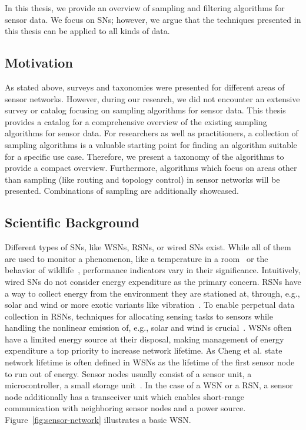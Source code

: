 In this thesis, we provide an overview of sampling and filtering algorithms for
sensor data. We focus on \acp{SN}; however, we argue that the techniques
presented in this thesis can be applied to all kinds of data. 


\subsection{Motivation}
\label{sec:motivation}

As stated above, surveys and taxonomies were presented for different areas of
sensor networks. However, during our research, we did not encounter an
extensive survey or catalog focusing on sampling algorithms for sensor data.
This thesis provides a catalog for a comprehensive overview of the existing
sampling algorithms for sensor data. For researchers as well as practitioners,
a collection of sampling algorithms is a valuable starting point for finding an
algorithm suitable for a specific use case. Therefore, we present a taxonomy of
the algorithms to provide a compact overview. Furthermore, algorithms which
focus on areas other than sampling (like routing and topology control) in
sensor networks will be presented. Combinations of sampling are additionally
showcased.

\subsection{Scientific Background}
\label{sec:Scientific Background}

Different types of \acp{SN}, like \acp{WSN}, \acp{RSN}, or wired \acp{SN}
exist. While all of them are used to monitor a phenomenon, like a temperature
in a room~\cite{labdata} or the behavior of
wildlife~\cite{bennett2011cranetracker}, performance indicators vary in their
significance. Intuitively, wired \acp{SN} do not consider energy expenditure as
the primary concern. \acp{RSN} have a way to collect energy from the
environment they are stationed at, through, e.g., solar and wind or more exotic
variants like vibration~\cite{perpetuum}. To enable perpetual data collection
in \acp{RSN}, techniques for allocating sensing tasks to sensors while handling
the nonlinear emission of, e.g., solar and wind is
crucial~\cite{liu2011perpetual}. \acp{WSN} often have a limited energy source
at their disposal, making management of energy expenditure a top priority to
increase network lifetime. As Cheng et al. state~\cite{cheng2013stcdg} network
lifetime is often defined in \acp{WSN} as the lifetime of the first sensor node
to run out of energy. Sensor nodes usually consist of a sensor unit, a
microcontroller, a small storage unit~\cite{akyildiz2002wireless}. In the case
of a \ac{WSN} or a \ac{RSN}, a sensor node additionally has a transceiver unit
which enables short-range communication with neighboring sensor nodes and a
power source. Figure~\ref{fig:sensor-network} illustrates a basic \ac{WSN}.

